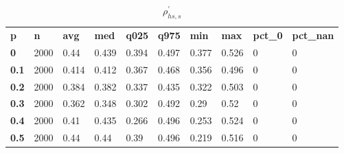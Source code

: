\begin{table}[h]
 \centering 
\footnotesize
\caption{$\rho_{hs,s}^\prime $}
\label{tab:alphahss}
\begin{tabular}[h]{| l l l l l l l l l l|
    } \hline
\textbf{ p} & \textbf{ n} & \textbf{ avg} & \textbf{ med} & \textbf{ q025} & \textbf{ q975} & \textbf{ min} & \textbf{ max} & \textbf{ pct\_0} & \textbf{ pct\_nan}
           \\
  \textbf{  0} & 2000 &  0.44 & 0.439 & 0.394 & 0.497 & 0.377 & 0.526 & 0 & 0
           \\
  \textbf{0.1} & 2000 & 0.414 & 0.412 & 0.367 & 0.468 & 0.356 & 0.496 & 0 & 0
           \\
  \textbf{0.2} & 2000 & 0.384 & 0.382 & 0.337 & 0.435 & 0.322 & 0.503 & 0 & 0
           \\
  \textbf{0.3} & 2000 & 0.362 & 0.348 & 0.302 & 0.492 &  0.29 &  0.52 & 0 & 0
           \\
  \textbf{0.4} & 2000 &  0.41 & 0.435 & 0.266 & 0.496 & 0.253 & 0.524 & 0 & 0
           \\
  \textbf{0.5} & 2000 &  0.44 &  0.44 &  0.39 & 0.496 & 0.219 & 0.516 & 0 & 0
           \\
 \hline \end{tabular}
 \end{table}
